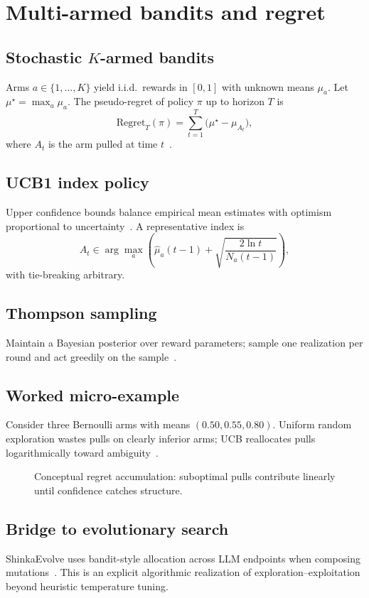 \section{Multi-armed bandits and regret}
\label{sec:bandits}

\subsection{Stochastic $K$-armed bandits}
Arms $a\in\{1,\dots,K\}$ yield i.i.d.\ rewards in $[0,1]$ with unknown means $\mu_a$.
Let $\mu^\star=\max_a \mu_a$.
The pseudo-regret of policy $\pi$ up to horizon $T$ is
\begin{equation}
  \mathrm{Regret}_T(\pi)
  = \sum_{t=1}^{T} \bigl(\mu^\star - \mu_{A_t}\bigr),
\end{equation}
where $A_t$ is the arm pulled at time $t$~\cite{lai1985asymptotically}.

\subsection{UCB1 index policy}
Upper confidence bounds balance empirical mean estimates with optimism proportional to uncertainty~\cite{auer2002finite}.
A representative index is
\begin{equation}
  A_t \in \arg\max_{a}
  \left(
    \hat{\mu}_a(t-1) + \sqrt{\frac{2\ln t}{N_a(t-1)}}
  \right),
\end{equation}
with tie-breaking arbitrary.

\subsection{Thompson sampling}
Maintain a Bayesian posterior over reward parameters; sample one realization per round and act greedily on the sample~\cite{russo2018tutorial,agrawal2012analysis}.

\subsection{Worked micro-example}
Consider three Bernoulli arms with means $(0.50,0.55,0.80)$.
Uniform random exploration wastes pulls on clearly inferior arms; UCB reallocates pulls logarithmically toward ambiguity~\cite{auer2002finite}.

\begin{figure}[t]
  \centering
  
  \caption{Conceptual regret accumulation: suboptimal pulls contribute linearly until confidence catches structure.}
  \label{fig:bandit}
\end{figure}

\subsection{Bridge to evolutionary search}
ShinkaEvolve uses bandit-style allocation across LLM endpoints when composing mutations~\cite{lange2025shinka}.
This is an explicit algorithmic realization of exploration--exploitation beyond heuristic temperature tuning.
